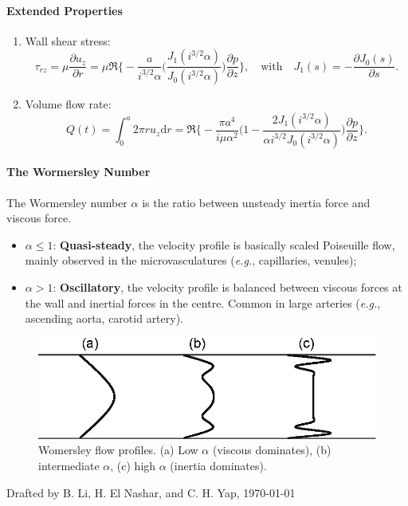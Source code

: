 \documentclass[a4paper]{article}
\begin{document}
\paragraph{Extended Properties}
\begin{enumerate}
    \item  Wall shear stress: 
    \[
        \tau_{rz} = \mu \frac{\partial u_{z}}{\partial r} = \mu \Re\bigg\{ -\frac{a}{i^{3/2}\alpha} \bigg( \frac{J_{1}(i^{3/2}\alpha)}{J_{0}(i^{3/2}\alpha)} \bigg) \frac{\partial p}{\partial z} \bigg\}, 
        \quad \text{with} \quad 
        J_1(s) = -\frac{\partial J_0(s)}{\partial s}.
    \]

    \item Volume flow rate: 
    \[
        Q(t) = \int_{0}^{a} 2\pi r u_{z} \mathrm{d}r = \Re\bigg\{ -\frac{\pi a^{4}}{i \mu \alpha^{2}} \bigg( 1 - \frac{2J_{1}(i^{3/2}\alpha)}{\alpha i^{3/2} J_{0}(i^{3/2}\alpha)} \bigg) \frac{\partial p}{\partial z} \bigg\}.
    \]
\end{enumerate}

\paragraph{The Wormersley Number}
The Wormersley number $\alpha$ is the ratio between unsteady inertia force and viscous force.
\begin{itemize}
    \item $\alpha \leq 1 $: \textbf{Quasi-steady}, the velocity profile is basically scaled Poiseuille flow, mainly observed in the microvasculatures (\textit{e.g.}, capillaries, venules);
    \item $\alpha > 1 $: \textbf{Oscillatory}, the velocity profile is balanced between viscous forces at the wall and inertial forces in the centre. Common in large arteries (\textit{e.g.}, ascending aorta, carotid artery).
\end{itemize}

\begin{figure}[H]
    \centering
    \includegraphics[width=.55\textwidth]{img/wo_plot.eps}
    \caption{Womersley flow profiles. (a) Low $\alpha$ (viscous dominates), (b) intermediate $\alpha$, (c) high $\alpha$ (inertia dominates).}
\end{figure}


\vfill
{\small \color{gray}Drafted by B. Li, H. El Nashar, and C. H. Yap,  \today}
% 
\end{document}
